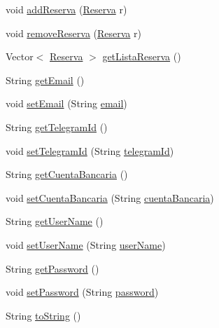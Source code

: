 \begin{DoxyCompactItemize}
\item 
void \mbox{\hyperlink{classdomain_1_1_client_aca417158adc1bb7fafe02b8f54265edf}{add\+Reserva}} (\mbox{\hyperlink{classdomain_1_1_reserva}{Reserva}} r)
\item 
void \mbox{\hyperlink{classdomain_1_1_client_a1be8ad60fb1d03ec9895640d87ab5576}{remove\+Reserva}} (\mbox{\hyperlink{classdomain_1_1_reserva}{Reserva}} r)
\item 
Vector$<$ \mbox{\hyperlink{classdomain_1_1_reserva}{Reserva}} $>$ \mbox{\hyperlink{classdomain_1_1_client_ac8b0f7513cd299b00a0e8cb44a70e3c4}{get\+Lista\+Reserva}} ()
\item 
String \mbox{\hyperlink{classdomain_1_1_client_afd3ba7dd00443e3ec17de99f43b27a58}{get\+Email}} ()
\item 
void \mbox{\hyperlink{classdomain_1_1_client_a525e1e3b7447d73947fa880f4c836872}{set\+Email}} (String \mbox{\hyperlink{classdomain_1_1_client_a47341a6cb46fb5c2c61885669070a939}{email}})
\item 
String \mbox{\hyperlink{classdomain_1_1_client_a270e88c8a507605cbf095581ef356e1a}{get\+Telegram\+Id}} ()
\item 
void \mbox{\hyperlink{classdomain_1_1_client_aa0ab199ddacd36d8feb16cff4c01a506}{set\+Telegram\+Id}} (String \mbox{\hyperlink{classdomain_1_1_client_a48de873a69fd65be53e47b2cbb2c309d}{telegram\+Id}})
\item 
String \mbox{\hyperlink{classdomain_1_1_client_adeb2b614c2e27afd7e1c1f50ba0a561f}{get\+Cuenta\+Bancaria}} ()
\item 
void \mbox{\hyperlink{classdomain_1_1_client_a02858d702a1b74589412777da82111ca}{set\+Cuenta\+Bancaria}} (String \mbox{\hyperlink{classdomain_1_1_client_a91e08d53a5af62a7822f25c0741b9828}{cuenta\+Bancaria}})
\item 
String \mbox{\hyperlink{classdomain_1_1_client_aa3cb01ad1be8a3ad758ef94bbf60c69c}{get\+User\+Name}} ()
\item 
void \mbox{\hyperlink{classdomain_1_1_client_ad9b344ef61d744d882eba788694aa96f}{set\+User\+Name}} (String \mbox{\hyperlink{classdomain_1_1_client_a759c4fe989503ceb29bcefca63177186}{user\+Name}})
\item 
String \mbox{\hyperlink{classdomain_1_1_client_abc586f272267f9312e1341fef8c5486c}{get\+Password}} ()
\item 
void \mbox{\hyperlink{classdomain_1_1_client_ae13843f725fdfd5d85a3a4176b9ee8a9}{set\+Password}} (String \mbox{\hyperlink{classdomain_1_1_client_ad8c3f3e676480cdf083669c007f1e397}{password}})
\item 
String \mbox{\hyperlink{classdomain_1_1_client_a5fc558240fa2d8ee6a87c41d373069fc}{to\+String}} ()
\end{DoxyCompactItemize}
